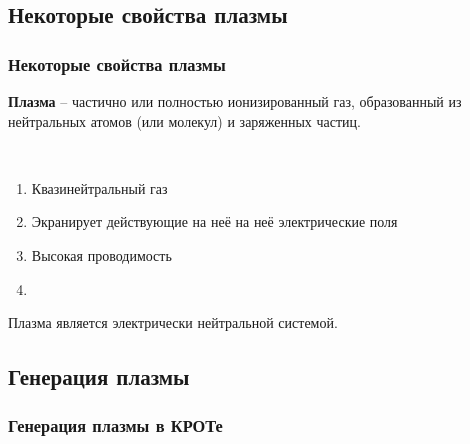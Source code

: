 \documentclass[10pt,pdf,hyperref={unicode}, dvipsnames]{beamer}
\begin{document}
\subsection{Некоторые свойства плазмы}
\begin{frame}
	\frametitle{Некоторые свойства плазмы}
	\textbf{Плазма} -- частично или полностью ионизированный газ, образованный из нейтральных атомов (или молекул) и заряженных частиц.

	$\,$
	\begin{enumerate}
		\item Квазинейтральный газ
		\item Экранирует действующие на неё на неё электрические поля
		\item Высокая проводимость
		\item 
	\end{enumerate}
	Плазма является электрически нейтральной системой.
\end{frame}

\subsection{Генерация плазмы}
\begin{frame}
	\frametitle{Генерация плазмы в КРОТе}
\end{frame}




		
	
\end{document}
